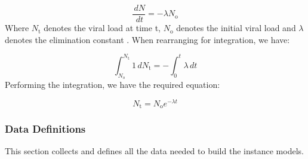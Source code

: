 \documentclass[12pt]{article}
\begin{document}
\begin{displaymath}
\frac{\,dN}{\,dt}=-λ {N_{\text{o}}}
\end{displaymath}
Where ${N_{\text{t}}}$ denotes the viral load at time t, ${N_{\text{o}}}$ denotes the initial viral load and $λ$ denotes the elimination constant . When rearranging for integration,  we have:

\begin{displaymath}
\int_{{N_{\text{o}}}}^{{N_{\text{t}}}}{1}\,d{N_{\text{t}}}=-\int_{0}^{t}{λ}\,dt
\end{displaymath}
Performing the integration, we have the required equation:

\begin{displaymath}
{N_{\text{t}}}={N_{\text{o}}} e^{-λ t}
\end{displaymath}
\subsubsection{Data Definitions}
\label{Sec:DDs}
This section collects and defines all the data needed to build the instance models.
\end{document}
